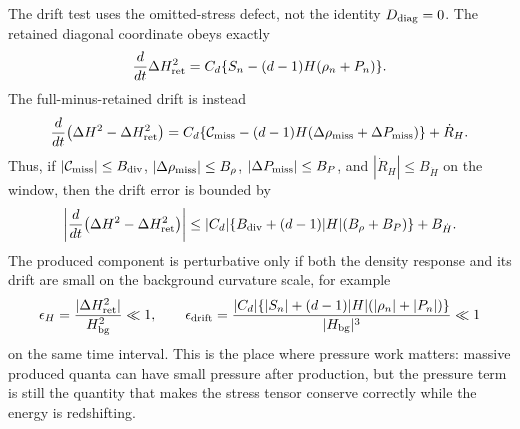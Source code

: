 \begin{controlledapproximation}
The drift test uses the omitted-stress defect, not the identity
\(D_{\rm diag}=0\).  The retained diagonal coordinate obeys exactly
\begin{equation}
  \frac{d}{dt}\Delta H_{\rm ret}^2
  =
  C_d\{S_n-(d-1)H(\rho_n+P_n)\}.
  \label{eq:cosmology-produced-retained-hubble-drift}
\end{equation}
The full-minus-retained drift is instead
\begin{equation}
  \frac{d}{dt}\bigl(\Delta H^2-\Delta H_{\rm ret}^2\bigr)
  =
  C_d\{{\mathcal C}_{\rm miss}
       -(d-1)H(\Delta\rho_{\rm miss}+\Delta P_{\rm miss})\}
  +\dot R_H .
  \label{eq:cosmology-produced-hubble-drift}
\end{equation}
Thus, if
\(|{\mathcal C}_{\rm miss}|\le B_{\rm div}\),
\(|\Delta\rho_{\rm miss}|\le B_\rho\),
\(|\Delta P_{\rm miss}|\le B_P\), and \(|\dot R_H|\le B_{\dot H}\) on the
window, then the drift error is bounded by
\begin{equation}
  \left|
  \frac{d}{dt}\bigl(\Delta H^2-\Delta H_{\rm ret}^2\bigr)
  \right|
  \le
  |C_d|\{B_{\rm div}+(d-1)|H|(B_\rho+B_P)\}+B_{\dot H}.
  \label{eq:cosmology-produced-hubble-drift-error-bound}
\end{equation}
The produced component is perturbative only if both the density response and
its drift are small on the background curvature scale, for example
\[
  \epsilon_H=\frac{|\Delta H_{\rm ret}^2|}{H_{\rm bg}^2}\ll1,\qquad
  \epsilon_{\rm drift}
  =
  \frac{|C_d|\{ |S_n|+(d-1)|H|(|\rho_n|+|P_n|)\}}
       {|H_{\rm bg}|^3}
  \ll1
\]
on the same time interval.  This is the place where pressure work matters:
massive produced quanta can have small pressure after production, but the
pressure term is still the quantity that makes the stress tensor conserve
correctly while the energy is redshifting.


\end{controlledapproximation}
